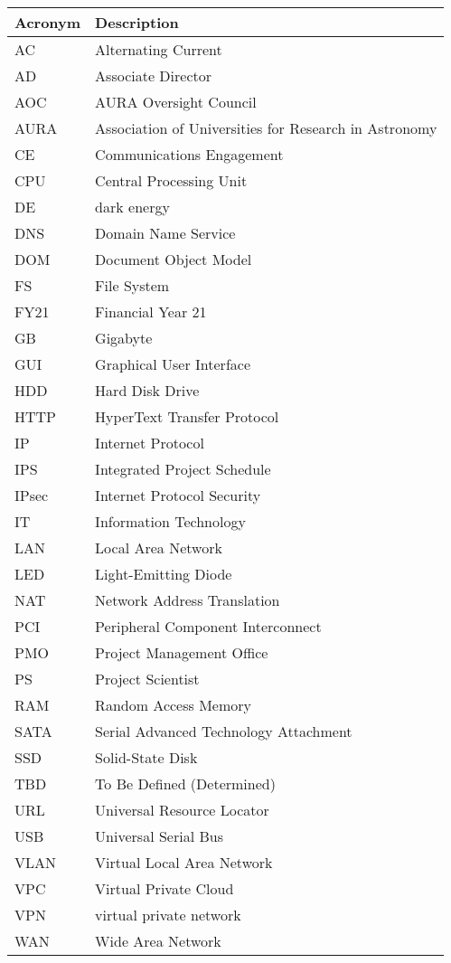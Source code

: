 \addtocounter{table}{-1}
\begin{longtable}{p{}p{}}\hline
\textbf{Acronym} & \textbf{Description}  \\\hline

AC & Alternating Current \\\hline
AD & Associate Director \\\hline
AOC &  AURA Oversight Council \\\hline
AURA & Association of Universities for Research in Astronomy \\\hline
CE & Communications Engagement \\\hline
CPU & Central Processing Unit \\\hline
DE & dark energy \\\hline
DNS & Domain Name Service \\\hline
DOM & Document Object Model \\\hline
FS & File System \\\hline
FY21 & Financial Year 21 \\\hline
GB & Gigabyte \\\hline
GUI & Graphical User Interface \\\hline
HDD &  Hard Disk Drive \\\hline
HTTP & HyperText Transfer Protocol \\\hline
IP & Internet Protocol \\\hline
IPS & Integrated Project Schedule \\\hline
IPsec & Internet Protocol Security \\\hline
IT & Information Technology \\\hline
LAN & Local Area Network \\\hline
LED & Light-Emitting Diode \\\hline
NAT & Network Address Translation \\\hline
PCI & Peripheral Component Interconnect \\\hline
PMO & Project Management Office \\\hline
PS & Project Scientist \\\hline
RAM & Random Access Memory \\\hline
SATA & Serial Advanced Technology Attachment \\\hline
SSD & Solid-State Disk \\\hline
TBD & To Be Defined (Determined) \\\hline
URL & Universal Resource Locator \\\hline
USB & Universal Serial Bus \\\hline
VLAN &  Virtual Local Area Network \\\hline
VPC &  Virtual Private Cloud \\\hline
VPN & virtual private network \\\hline
WAN & Wide Area Network \\\hline
\end{longtable}
